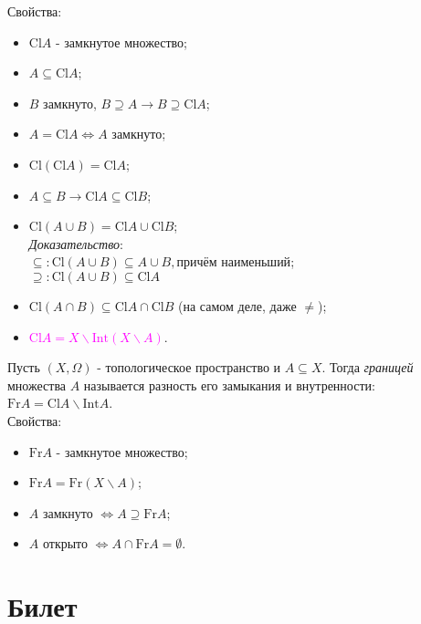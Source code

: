 \documentclass[a4paper,100pt]{article}
\theoremstyle{indented}
\begin{document}
Свойства:
\begin{itemize}
    
    \item $\text{Cl}A$ - замкнутое множество;
    \item $A\subseteq \text{Cl}A$;
    \item $B$ замкнуто, $B\supseteq A \rightarrow B \supseteq \text{Cl}A$;
    \item $A = \text{Cl}A \Leftrightarrow A$ замкнуто;
    \item $\text{Cl}(\text{Cl}A)=\text{Cl}A$;
    \item $A\subseteq B \rightarrow \text{Cl}A\subseteq \text{Cl}B$;
    \item $\text{Cl}(A\cup B)=\text{Cl}A\cup \text{Cl}B$; \\ 
    \textit{Доказательство}:\\
    $\subseteq: \text{Cl}(A\cup B)\subseteq A\cup B, \text{причём наименьший}$; \\
    $\supseteq: \text{Cl}(A\cup B)\subseteq \text{Cl}A$
    \item $\text{Cl}(A\cap B)\subseteq \text{Cl}A\cap\text{Cl}B $ (на самом деле, даже $\neq$);
    \item \textcolor{magenta}{$\text{Cl}A=X\backslash \text{Int}(X\backslash A)$}.

\end{itemize}

Пусть $(X, \Omega)$ - топологическое пространство и $A\subseteq X$. Тогда \textit{границей} \hypertarget{n9}{множества} $A$ называется разность его замыкания и внутренности: $\text{Fr}A = \text{Cl}A\backslash \text{Int}A$. \\

Свойства:
\begin{itemize}

    \item $\text{Fr} A$ - замкнутое множество;
    \item $\text{Fr} A = \text{Fr}(X\backslash A)$;
    \item $A$ замкнуто $\Leftrightarrow A \supseteq \text{Fr} A$;
    \item $A$ открыто $\Leftrightarrow A \cap \text{Fr} A = \emptyset$.

\end{itemize}

\section{Билет} \
\end{document}

